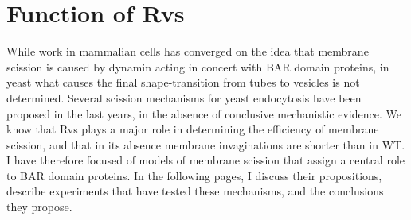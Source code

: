		
\section{Function of Rvs}


While work in mammalian cells has converged on the idea that membrane scission is caused by dynamin acting in concert with BAR domain proteins, in yeast what causes the final shape-transition from tubes to vesicles is not determined. Several scission mechanisms for yeast endocytosis have been proposed in the last years, in the absence of conclusive mechanistic evidence. We know that Rvs plays a major role in determining the efficiency of membrane scission, and that in its absence membrane invaginations are shorter than in WT. I have therefore focused of models of membrane scission that assign a central role to BAR domain proteins. In the following pages, I discuss their propositions, describe experiments that have tested these mechanisms, and the conclusions they propose. 


\vspace{3mm}
